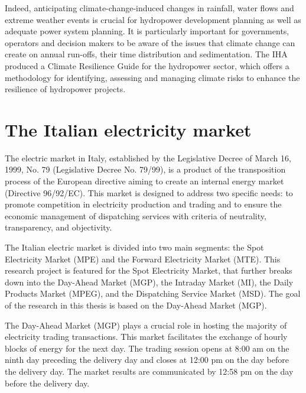 Indeed, anticipating climate-change-induced changes in rainfall, water flows and extreme weather events is crucial for hydropower development planning as well as adequate power system planning. It is particularly important for governments, operators and decision makers to be aware of the issues that climate change can create on annual run-offs, their time distribution and sedimentation. The IHA produced a Climate Resilience Guide  for the hydropower sector, which offers a methodology for identifying, assessing and managing climate risks to enhance the resilience of hydropower projects.



\section{The Italian electricity market\label{section1.2}}

The electric market in Italy, established by the Legislative Decree of March 16, 1999, No. 79 (Legislative Decree No. 79/99), is a product of the transposition process of the European directive aiming to create an internal energy market (Directive 96/92/EC). This market is designed to address two specific needs: to promote competition in electricity production and trading and to ensure the economic management of dispatching services with criteria of neutrality, transparency, and objectivity.

The Italian electric market is divided into two main segments: the Spot Electricity Market (MPE) and the Forward Electricity Market (MTE). This research project is featured for the Spot Electricity Market, that further breaks down into the Day-Ahead Market (MGP), the Intraday Market (MI), the Daily Products Market (MPEG), and the Dispatching Service Market (MSD). The goal of the research in this thesis is based on the Day-Ahead Market (MGP).

The Day-Ahead Market (MGP) plays a crucial role in hosting the majority of electricity trading transactions. This market facilitates the exchange of hourly blocks of energy for the next day. The trading session opens at 8:00 am on the ninth day preceding the delivery day and closes at 12:00 pm on the day before the delivery day. The market results are communicated by 12:58 pm on the day before the delivery day.


